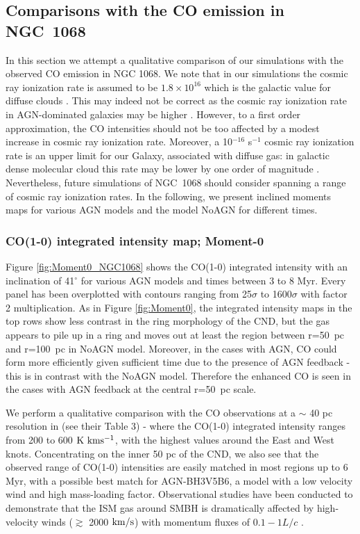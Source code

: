 \documentclass[fleqn,usenatbib]{mnras}
\begin{document}
\subsection{Comparisons with the CO emission in NGC~1068}
In this section we attempt a qualitative comparison of our simulations with the observed CO emission in NGC 1068.  We note that in our simulations  the cosmic ray ionization  rate is assumed to be $1.8 \times 10^{16}$ which is the galactic value for diffuse clouds \citep[e.g; Milky Way][]{Indriolo2012}. This may indeed not be correct as the cosmic ray ionization rate in AGN-dominated galaxies may be higher \citep[e.g;][]{Aladro2013,Viti2014,Scourfield2020}. However, to a first order approximation, the CO intensities should not be too affected by a modest increase in cosmic ray ionization rate. Moreover, a 10$^{-16}$ s$^{-1}$ cosmic ray ionization rate is an upper limit for our Galaxy, associated with diffuse gas: in galactic dense molecular cloud this rate may be lower by one order of magnitude \citep{Li2003}. Nevertheless, future simulations of NGC~1068 should consider spanning a range of cosmic ray ionization rates. In the following, we present inclined moments maps for various AGN models and the model NoAGN for different times.  

\subsubsection{CO(1-0) integrated intensity map; Moment-0}
Figure \ref{fig:Moment0_NGC1068} shows the CO(1-0) integrated intensity with an inclination of 41$^\circ$ \citep[which corresponds to NGC 1068's inclination as firstly reported in][]{Bland-Hawthorn1997} for various AGN models and times between 3 to 8 Myr. Every panel has been overplotted with contours ranging from 25$\sigma$ to 1600$\sigma$ with factor 2 multiplication. 
As in  Figure \ref{fig:Moment0}, the integrated intensity maps in the top rows show less contrast in the ring morphology of the CND, but the gas appears to pile up in a ring and moves out at least the region between r=50~pc and r=100~pc in NoAGN model. 
Moreover, in the cases with AGN, CO  could form more efficiently given sufficient time due to the presence of AGN feedback - this is in contrast with the NoAGN model. Therefore the enhanced CO is seen in the cases with AGN feedback at the central r=50~pc scale.

We perform a qualitative comparison with the CO observations at a $\sim$ 40 pc resolution in \citet{Viti2014} (see their Table 3) -  where the CO(1-0) integrated intensity ranges from 200 to 600 $\rm K\ kms^{-1}$, with the highest values around the East and West knots. 
Concentrating on the inner 50 pc of the CND, we also see that the observed range of CO(1-0) intensities are easily matched in most regions up to 6 Myr, with a possible best match for AGN-BH3V5B6, a model with a low velocity wind and high mass-loading factor. Observational studies have been conducted to demonstrate that the ISM gas around SMBH is dramatically affected by high-velocity winds ($\gtrsim$ 2000 $\rm km/s$) with momentum fluxes of $0.1-1L/c$ \citep[e.g.][]{Cimatti2013,Harrison2014,Zakamska2016}. 
\end{document}
